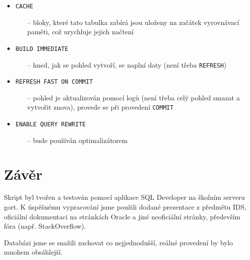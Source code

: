 \documentclass[a4paper, 11pt]{article}
\begin{document}
\begin{itemize}
	\item \texttt{CACHE}
	\begin{itemize}
		\item[--] bloky, které tato tabulka zabírá jsou uloženy na začátek vyrovnávací paměti, což urychluje jejich načtení
	\end{itemize}
	\item \texttt{BUILD IMMEDIATE}
	\begin{itemize}
		\item[--] hned, jak se pohled vytvoří, se naplní daty (není třeba \texttt{REFRESH})
	\end{itemize}
	\item \texttt{REFRESH FAST ON COMMIT}
	\begin{itemize}
		\item[--] pohled je aktualizován pomocí logů (není třeba celý pohled smazat a vytvořit znova), provede se při provedení \texttt{COMMIT}
	\end{itemize}
	\item \texttt{ENABLE QUERY REWRITE}
	\begin{itemize}
		\item[--] bude používán optimalizátorem
	\end{itemize}
\end{itemize}

\section{Závěr}

Skript byl tvořen a testován pomocí aplikace SQL Developer na školním serveru gort. K úspěšnému vypracování jsme použili dodané prezentace z předmětu IDS, oficiální dokumentaci na stránkách Oracle a jiné neoficiální stránky, především fóra (např. StackOverflow).

Databázi jsme se snažili zachovat co nejjednodušší, reálné provedení by bylo mnohem obsáhlejší.
\end{document}
